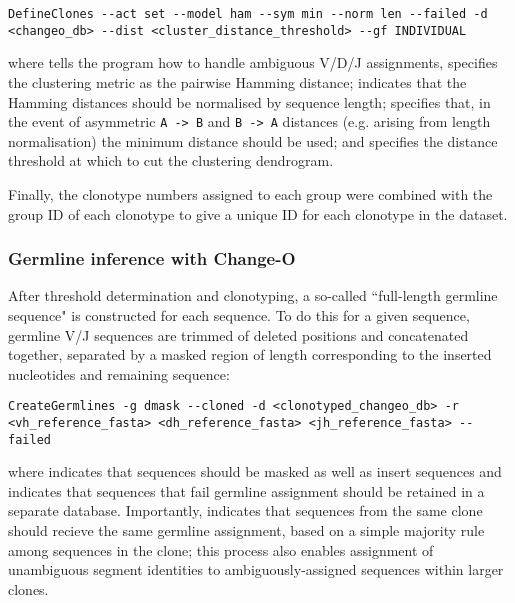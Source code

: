 {\begin{lstlisting}
DefineClones --act set --model ham --sym min --norm len --failed -d <changeo_db> --dist <cluster_distance_threshold> --gf INDIVIDUAL
\end{lstlisting}

\noindent where  tells the program how to handle ambiguous V/D/J assignments,  specifies the clustering metric as the pairwise Hamming distance;  indicates that the Hamming distances should be normalised by sequence length;  specifies that, in the event of asymmetric \texttt{A -> B} and \texttt{B -> A} distances (e.g. arising from length normalisation) the minimum distance should be used; and  specifies the distance threshold at which to cut the clustering dendrogram.

Finally, the clonotype numbers assigned to each group %
were combined with the group ID of each clonotype to give a unique ID for each clonotype in the dataset.

\subsubsection{Germline inference with Change-O}
\label{sec:methods_comp_igpreproc_clones}

After threshold determination and clonotyping, a so-called ``full-length germline sequence" is constructed for each sequence. To do this for a given sequence, germline V/J sequences are trimmed of deleted positions and concatenated together, separated by a masked region of length corresponding to the inserted nucleotides and remaining \dh sequence:

\begin{lstlisting}
CreateGermlines -g dmask --cloned -d <clonotyped_changeo_db> -r <vh_reference_fasta> <dh_reference_fasta> <jh_reference_fasta> --failed
\end{lstlisting}

where  indicates that \dh sequences should be masked as well as insert sequences and  indicates that sequences that fail germline assignment should be retained in a separate database. Importantly,  indicates that sequences from the same clone should recieve the same germline assignment, based on a simple majority rule among sequences in the clone; this process also enables assignment of unambiguous segment identities to ambiguously-assigned sequences within larger clones.

}

